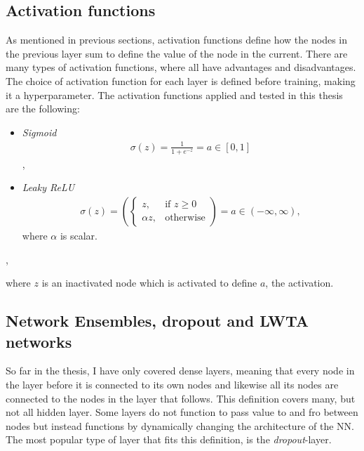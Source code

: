 \subsection{Activation functions}\label{subsec:activation}
As mentioned in previous sections, activation functions define how the nodes in the previous layer 
sum to define the value of the node in the current. There are many types of activation functions, 
where all have advantages and disadvantages. The choice of activation function for each layer is defined
before training, making it a hyperparameter. The activation functions applied and tested in this thesis are the following:
\begin{center}
\begin{itemize}
    \item  \emph{Sigmoid}\\  
    \begin{align*}
         \sigma{(z)} = \frac{1}{1+e^{-z}} = a \in [0,1]
    \end{align*},
    \item \emph{Leaky ReLU}
    \begin{align*}
        \sigma{(z)} = \left(
        \begin{cases}
            z,& \text{if } z\geq 0\\
            \alpha z,              & \text{otherwise}
        \end{cases}\right)
        = a \in (-\infty, \infty),
   \end{align*}
   where $\alpha$ is scalar.
\end{itemize},
\end{center}
where $z$ is an inactivated node which is activated to define $a$, the activation.

\subsection{Network Ensembles, dropout and LWTA networks}
So far in the thesis, I have only covered dense layers, meaning that every node in the layer before it is 
connected to its own nodes and likewise all its nodes are connected to the nodes in the layer that follows. 
This definition covers many, but not all hidden layer. Some layers do not function to pass value to and 
fro between nodes but instead functions by dynamically changing the architecture of the \ac{NN}. The most popular 
type of layer that fits this definition, is the \emph{dropout}-layer. 
